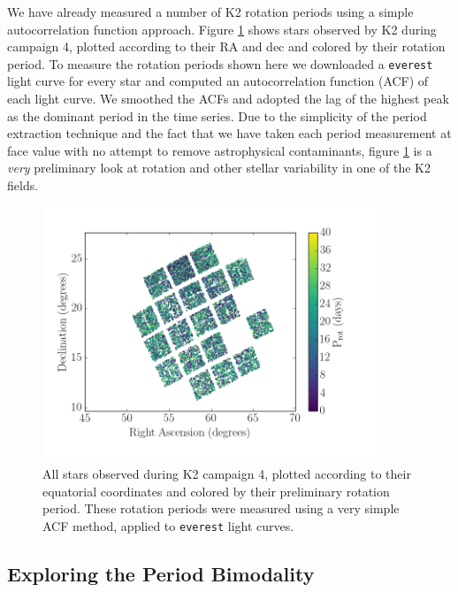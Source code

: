 \documentclass[12pt]{article}
\begin{document}
We have already measured a number of K2 rotation periods using a simple
autocorrelation function approach.
Figure \ref{fig:kalesalad} shows stars observed by K2 during campaign 4,
plotted according to their RA and dec and colored by their rotation period.
To measure the rotation periods shown here we downloaded a
{\tt everest} \citep{luger2016} light curve for every star and computed an
autocorrelation function (ACF) of each light curve.
We smoothed the ACFs and adopted the lag of the highest peak as the dominant
period in the time series.
Due to the simplicity of the period extraction technique and the fact that we
have taken each period measurement at face value with no attempt to remove
astrophysical contaminants, figure \ref{fig:kalesalad} is a {\it very}
preliminary look at rotation and other stellar variability in one of the K2
fields.

\begin{figure}[!th]
\centering
\includegraphics[width=4in]{ra_vs_dec_period_c04.png}
\caption{All stars observed during K2 campaign 4, plotted according to their
    equatorial coordinates and colored by their preliminary rotation period.
These rotation periods were measured using a very simple ACF method, applied
    to {\tt everest} \citep{Luger2015} light curves.}
\label{fig:kalesalad}
\end{figure}





\subsection{Exploring the Period Bimodality}
\end{document}
